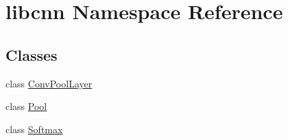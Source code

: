 \hypertarget{namespacelibcnn}{\section{libcnn \-Namespace \-Reference}
\label{namespacelibcnn}
}
\subsection*{\-Classes}
\begin{DoxyCompactItemize}
\item 
class \hyperlink{classlibcnn_1_1_conv_pool_layer}{\-Conv\-Pool\-Layer}
\item 
class \hyperlink{classlibcnn_1_1_pool}{\-Pool}
\item 
class \hyperlink{classlibcnn_1_1_softmax}{\-Softmax}
\end{DoxyCompactItemize}
